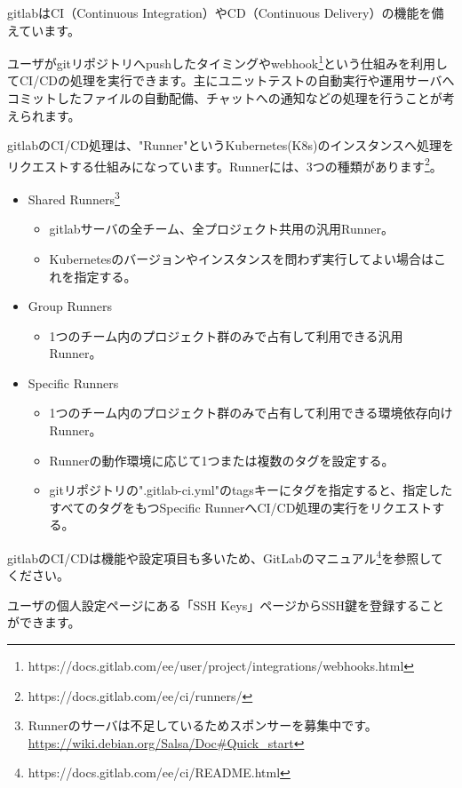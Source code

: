 \documentclass[mingoth,a4paper]{jsarticle}
\begin{document}

gitlabはCI（Continuous Integration）やCD（Continuous Delivery）の機能を備えています。


ユーザがgitリポジトリへpushしたタイミングやwebhook\footnote{https://docs.gitlab.com/ee/user/project/integrations/webhooks.html}という仕組みを利用してCI/CDの処理を実行できます。主にユニットテストの自動実行や運用サーバへコミットしたファイルの自動配備、チャットへの通知などの処理を行うことが考えられます。


gitlabのCI/CD処理は、"Runner"というKubernetes(K8s)のインスタンスへ処理をリクエストする仕組みになっています。Runnerには、3つの種類があります\footnote{https://docs.gitlab.com/ee/ci/runners/}。

\begin{itemize}
\item Shared Runners\footnote{Runnerのサーバは不足しているためスポンサーを募集中です。\url{https://wiki.debian.org/Salsa/Doc\#Quick_start}}
  \begin{itemize}
  \item gitlabサーバの全チーム、全プロジェクト共用の汎用Runner。
  \item Kubernetesのバージョンやインスタンスを問わず実行してよい場合はこれを指定する。
  \end{itemize}
\item Group Runners
  \begin{itemize}
  \item 1つのチーム内のプロジェクト群のみで占有して利用できる汎用Runner。
  \end{itemize}
\item Specific Runners
  \begin{itemize}
  \item 1つのチーム内のプロジェクト群のみで占有して利用できる環境依存向けRunner。
  \item Runnerの動作環境に応じて1つまたは複数のタグを設定する。
  \item gitリポジトリの".gitlab-ci.yml"のtagsキーにタグを指定すると、指定したすべてのタグをもつSpecific RunnerへCI/CD処理の実行をリクエストする。
  \end{itemize}
\end{itemize}

gitlabのCI/CDは機能や設定項目も多いため、GitLabのマニュアル\footnote{https://docs.gitlab.com/ee/ci/README.html}を参照してください。



ユーザの個人設定ページにある「SSH Keys」ページからSSH鍵を登録することができます。
\end{document}

